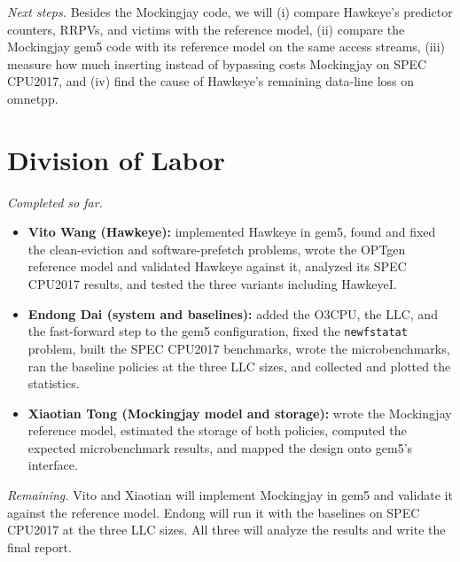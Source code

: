 \documentclass[10pt,journal,compsoc]{IEEEtran}
\begin{document}
\emph{Next steps.} Besides the Mockingjay code, we will (i) compare Hawkeye's
predictor counters, RRPVs, and victims with the reference model, (ii) compare
the Mockingjay gem5 code with its reference model on the same access streams,
(iii) measure how much inserting instead of bypassing costs Mockingjay on SPEC
CPU2017, and (iv) find the cause of Hawkeye's remaining data-line loss on
omnetpp.

\section{Division of Labor}

\emph{Completed so far.}
\begin{itemize}
\item \textbf{Vito Wang (Hawkeye):} implemented Hawkeye in gem5, found and
fixed the clean-eviction and software-prefetch problems, wrote the OPTgen
reference model and validated Hawkeye against it, analyzed its SPEC CPU2017
results, and tested the three variants including HawkeyeI.
\item \textbf{Endong Dai (system and baselines):} added the O3CPU, the LLC,
and the fast-forward step to the gem5 configuration, fixed the
\texttt{newfstatat} problem, built the SPEC CPU2017 benchmarks, wrote the
microbenchmarks, ran the baseline policies at the three LLC sizes, and
collected and plotted the statistics.
\item \textbf{Xiaotian Tong (Mockingjay model and storage):} wrote the
Mockingjay reference model, estimated the storage of both policies, computed
the expected microbenchmark results, and mapped the design onto gem5's
interface.
\end{itemize}

\emph{Remaining.} Vito and Xiaotian will implement Mockingjay in gem5 and
validate it against the reference model. Endong will run it with the baselines
on SPEC CPU2017 at the three LLC sizes. All three will analyze the results and
write the final report.
\end{document}
